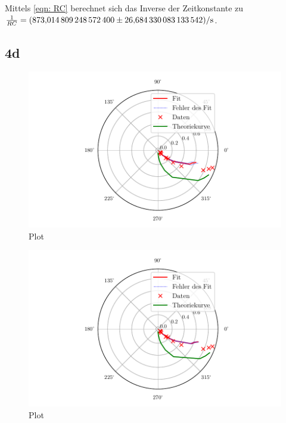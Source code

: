 Mittels \eqref{eqn: RC} berechnet sich das Inverse der Zeitkonstante zu %
$\frac{1}{RC} = \SI{873.0148092485724  \pm 26.684330083133542}{\per\second}$.

\subsection{4d}



\begin{figure}
  \centering
  \includegraphics{build/plotd1.pdf}
  \caption{Plot}
  \label{fig:plotd1}
\end{figure}

\begin{figure}
  \centering
  \includegraphics{build/plotd2.pdf}
  \caption{Plot}
  \label{fig:plotd2}
\end{figure}

